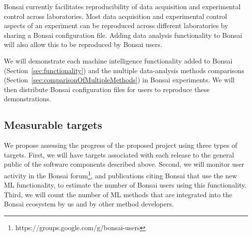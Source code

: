 Bonsai currently facilitates reproducibility of data acquisition
and experimental control across laboratories. Most data acquisition and
experimental control aspects of an experiment can be reproduced across
different laboratories by sharing a Bonsai configuration file. Adding data analysis functionality to Bonsai will also allow this to be reproduced by Bonsai users. 
%

We will demonstrate each machine intelligence functionality added to Bonsai
(Section~\ref{sec:functionality}) and the multiple
data-analysis methods comparisons
(Section~\ref{sec:comparisonOfMultipleMethods}) in Bonsai experiments. We will
then distribute Bonsai configuration files for users to reproduce these
demonstrations.

\subsection{Measurable targets}
\label{sec:measurableTargets}

We propose assessing the progress of the proposed project using three 
types of targets.
%
First, we will have targets associated with each release to the general public
of the software components described above. 
%
Second, we will monitor user activity in the Bonsai
forum\footnote{https://groups.google.com/g/bonsai-users},
and publications citing Bonsai that use the new ML functionality,
to estimate the number of Bonsai users using this functionality.
%
Third, we will count the number of ML methods that are integrated
into the Bonsai ecosystem by us and by other method developers.


